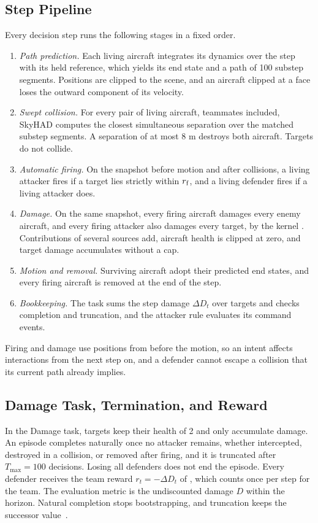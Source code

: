 \subsection{Step Pipeline}
Every decision step runs the following stages in a fixed order.
\begin{enumerate}
\item \emph{Path prediction.} Each living aircraft integrates its dynamics over the step with its held reference, which yields its end state and a path of 100 substep segments. Positions are clipped to the scene, and an aircraft clipped at a face loses the outward component of its velocity.
\item \emph{Swept collision.} For every pair of living aircraft, teammates included, SkyHAD computes the closest simultaneous separation over the matched substep segments. A separation of at most 8 m destroys both aircraft. Targets do not collide.
\item \emph{Automatic firing.} On the snapshot before motion and after collisions, a living attacker fires if a target lies strictly within $r_{\rm f}$, and a living defender fires if a living attacker does.
\item \emph{Damage.} On the same snapshot, every firing aircraft damages every enemy aircraft, and every firing attacker also damages every target, by the kernel . Contributions of several sources add, aircraft health is clipped at zero, and target damage accumulates without a cap.
\item \emph{Motion and removal.} Surviving aircraft adopt their predicted end states, and every firing aircraft is removed at the end of the step.
\item \emph{Bookkeeping.} The task sums the step damage $\Delta D_t$ over targets and checks completion and truncation, and the attacker rule evaluates its command events.
\end{enumerate}
Firing and damage use positions from before the motion, so an intent affects interactions from the next step on, and a defender cannot escape a collision that its current path already implies.

\subsection{Damage Task, Termination, and Reward}
In the Damage task, targets keep their health of 2 and only accumulate damage. An episode completes naturally once no attacker remains, whether intercepted, destroyed in a collision, or removed after firing, and it is truncated after $T_{\max}=100$ decisions. Losing all defenders does not end the episode. Every defender receives the team reward $r_t=-\Delta D_t$ of , which counts once per step for the team. The evaluation metric is the undiscounted damage $D$ within the horizon. Natural completion stops bootstrapping, and truncation keeps the successor value~\cite{pardo2018timelimits}.

